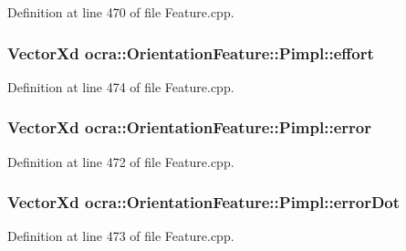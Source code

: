 Definition at line 470 of file Feature.\+cpp.

\subsubsection[{\texorpdfstring{effort}{effort}}]{\setlength{\rightskip}{0pt plus 5cm}Vector\+Xd ocra\+::\+Orientation\+Feature\+::\+Pimpl\+::effort}\hypertarget{structocra_1_1OrientationFeature_1_1Pimpl_a4e6285f990db663f2c73f629ae854650}{}\label{structocra_1_1OrientationFeature_1_1Pimpl_a4e6285f990db663f2c73f629ae854650}


Definition at line 474 of file Feature.\+cpp.

\subsubsection[{\texorpdfstring{error}{error}}]{\setlength{\rightskip}{0pt plus 5cm}Vector\+Xd ocra\+::\+Orientation\+Feature\+::\+Pimpl\+::error}\hypertarget{structocra_1_1OrientationFeature_1_1Pimpl_ac388b9a7c770d1c5af07c5b8f011a430}{}\label{structocra_1_1OrientationFeature_1_1Pimpl_ac388b9a7c770d1c5af07c5b8f011a430}


Definition at line 472 of file Feature.\+cpp.

\subsubsection[{\texorpdfstring{error\+Dot}{errorDot}}]{\setlength{\rightskip}{0pt plus 5cm}Vector\+Xd ocra\+::\+Orientation\+Feature\+::\+Pimpl\+::error\+Dot}\hypertarget{structocra_1_1OrientationFeature_1_1Pimpl_ad7b019fb36061c7906b7d68cd107a542}{}\label{structocra_1_1OrientationFeature_1_1Pimpl_ad7b019fb36061c7906b7d68cd107a542}


Definition at line 473 of file Feature.\+cpp.

